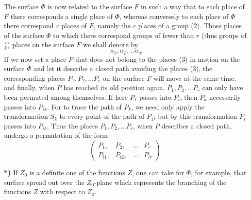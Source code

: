 \documentclass{article}
\begin{document}
The surface $\Phi$ is now related to the surface $F$ in such a way that to each place of $F$ there corresponds a single place of $\Phi$, whereas conversely to each place of $\Phi$ there correspond $r$ places of $F$, namely the $r$ places of a group (2). Those places of the surface $\Phi$ to which there correspond groups of fewer than $r$ (thus groups of $\frac{r}{k}$) places on the surface $F$ we shall denote by
\[
a_1, a_2, \dots a_w
\tag{3}
\]
If we now set a place $P$ that does not belong to the places (3) in motion on the surface $\Phi$ and let it describe a closed path avoiding the places (3), the corresponding places $P_1, P_2, \dots P_r$ on the surface $F$ will move at the same time, and finally, when $P$ has reached its old position again, $P_1, P_2, \dots P_r$ can only have been permuted among themselves. If here $P_1$ passes into $P_i$, then $P_k$ necessarily passes into $P_{ik}$. For to trace the path of $P_k$, we need only apply the transformation $S_k$ to every point of the path of $P_1$; but by this transformation $P_i$ passes into $P_{ik}$. Thus the places $P_1, P_2, \dots P_r$, when $P$ describes a closed path, undergo a permutation of the form
\[
\begin{pmatrix}
P_1, & P_2, & \dots & P_r \\
P_{i1}, & P_{i2}, & \dots & P_{ir}
\end{pmatrix}.
\tag{4}
\]

\textbf{*)} If $Z_0$ is a definite one of the functions $Z$, one can take for $\Phi$, for example, that surface spread out over the $Z_0$-plane which represents the branching of the functions $Z$ with respect to $Z_0$.
\end{document}
